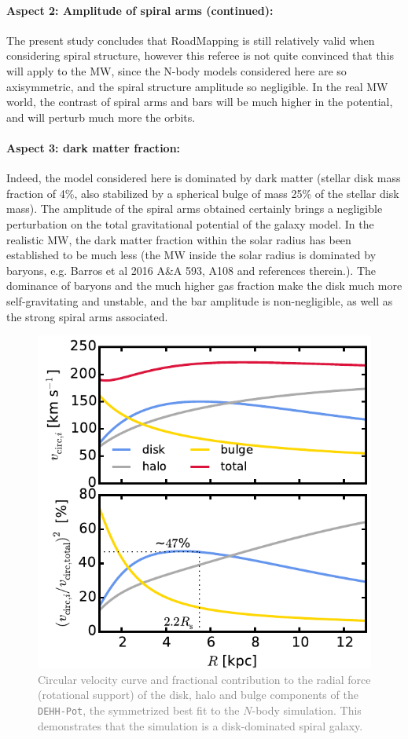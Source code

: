 \documentclass[10pt,a4paper]{article}
\newcommand{\Answer}[1]{\textcolor{Gray}{#1}}
\begin{document}
\paragraph{Aspect 2: Amplitude of spiral arms (continued):} The present study concludes that RoadMapping is still relatively valid when considering spiral structure, however this referee is not quite convinced that this
will apply to the MW, since the N-body models considered here are so axisymmetric,
and the spiral structure amplitude so negligible. In the real MW world, the contrast
of spiral arms and bars will be much higher in the potential, and will perturb much
more the orbits.  

\Answer{}

\paragraph{Aspect 3: dark matter fraction:} Indeed, the model considered here is dominated by dark matter (stellar disk mass fraction of 4\%, also stabilized by a spherical bulge of mass 25\% of the stellar disk mass). The amplitude of the spiral arms obtained certainly brings a negligible
perturbation on the total gravitational potential of the galaxy model. In the
realistic MW, the dark matter fraction within the solar radius has been established
to be much less (the MW inside the solar radius is dominated by baryons, e.g. Barros
et al 2016 A\&A 593, A108 and references therein.). The dominance of baryons and the
much higher gas fraction make the disk much more self-gravitating and unstable, and
the bar amplitude is non-negligible, as well as the strong spiral arms associated.

\begin{figure}[!htbp]
\centering
\includegraphics[width=0.7\columnwidth]{fig/plot_vcirc_decomposed.pdf}
\caption{\Answer{Circular velocity curve and fractional contribution to the radial force (rotational support) of the disk, halo and bulge components of the \texttt{DEHH-Pot}, the symmetrized best fit to the $N$-body simulation. This demonstrates that the simulation is a disk-dominated spiral galaxy.}}
\end{figure}
\end{document}
